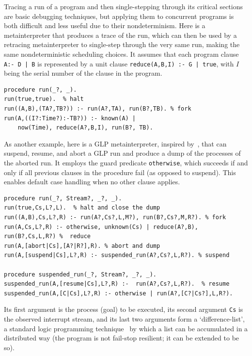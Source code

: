  Tracing a run of a program and then single-stepping through its critical sections are basic debugging techniques, but applying them to concurrent programs is both difficult and less useful due to their nondeterminism.  Here is a metainterpreter that produces a trace of the run, which can then be used by a retracing  metainterpreter to single-step through the very same run, making the same nondeterministic scheduling choices.
It assumes that each program clause \verb= A:- D | B= is represented by a unit clause
\verb=reduce(A,B,I) :- G | true=, with $I$ being the serial number of the clause in the program.

\label{program:metatree}
\begin{small}
\begin{verbatim}
procedure run(_?, _).
run(true,true).  % halt
run((A,B),(TA?,TB?)) :- run(A?,TA), run(B?,TB). % fork
run(A,((I?:Time?):-TB?)) :- known(A) |
    now(Time), reduce(A?,B,I), run(B?, TB).
\end{verbatim}
\end{small}


As another example, here is a GLP metainterpreter, inspired by~\cite{shapiro1984systems}, that can suspend, resume, and abort a GLP run and produce a dump of the processes of the aborted run. It employs the guard predicate \verb|otherwise|, which succeeds if and only if all previous clauses in the procedure fail (as opposed to suspend). This enables default case handling when no other clause applies.

\label{program:runtime}
\begin{small}
\begin{verbatim}
procedure run(_?, Stream?, _?, _).
run(true,Cs,L?,L).  % halt and close the dump
run((A,B),Cs,L?,R) :- run(A?,Cs?,L,M?), run(B?,Cs?,M,R?). % fork
run(A,Cs,L?,R) :- otherwise, unknown(Cs) | reduce(A?,B), run(B?,Cs,L,R?) %  reduce
run(A,[abort|Cs],[A?|R?],R). % abort and dump
run(A,[suspend|Cs],L?,R) :- suspended_run(A?,Cs?,L,R?). % suspend

procedure suspended_run(_?, Stream?, _?, _).
suspended_run(A,[resume|Cs],L?,R) :-  run(A?,Cs?,L,R?).  % resume
suspended_run(A,[C|Cs],L?,R) :- otherwise | run(A?,[C?|Cs?],L,R?).
\end{verbatim}
\end{small}

Its first argument is the process (goal) to be executed, its second argument \verb|Cs| is the observed interrupt stream, and its last two arguments form a `difference-list', a standard logic programming technique~\cite{sterling1994art} by which a list can be accumulated in a distributed way (the program is not fail-stop resilient; it can be extended to be so). 
 


